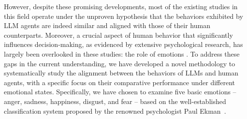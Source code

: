 \documentclass{article}
\begin{document}





However, despite these promising developments, most of the existing studies in this field operate under the unproven hypothesis that the behaviors exhibited by LLM agents are indeed similar and aligned with those of their human counterparts. Moreover, a crucial aspect of human behavior that significantly influences decision-making, as evidenced by extensive psychological research, has largely been overlooked in these studies: the role of emotions \cite{lerner2015emotion}. To address these gaps in the current understanding, we have developed a novel methodology to systematically study the alignment between the behaviors of LLMs and human agents, with a specific focus on their comparative performance under different emotional states. Specifically, we have chosen to examine five basic emotions – anger, sadness, happiness, disgust, and fear – based on the well-established classification system proposed by the renowned psychologist Paul Ekman~\cite{ekman1999basic}. 



\end{document}
